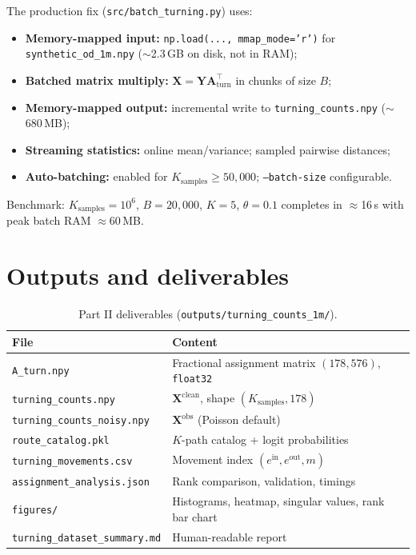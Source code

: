 \documentclass[11pt,a4paper]{report}
\newcommand{\mathbfX}{\mathbf{X}}
\newcommand{\mathbfY}{\mathbf{Y}}
\newcommand{\Aturn}{\mathbf{A}_{\mathrm{turn}}}
\begin{document}
The production fix (\texttt{src/batch\_turning.py}) uses:
\begin{itemize}[noitemsep]
    \item \textbf{Memory-mapped input:} \texttt{np.load(..., mmap\_mode='r')} for \texttt{synthetic\_od\_1m.npy} ($\sim$2.3\,GB on disk, not in RAM);
    \item \textbf{Batched matrix multiply:} $\mathbfX=\mathbfY\Aturn^\top$ in chunks of size $B$;
    \item \textbf{Memory-mapped output:} incremental write to \texttt{turning\_counts.npy} ($\sim$680\,MB);
    \item \textbf{Streaming statistics:} online mean/variance; sampled pairwise distances;
    \item \textbf{Auto-batching:} enabled for $K_{\mathrm{samples}}\ge 50{,}000$; \texttt{--batch-size} configurable.
\end{itemize}
Benchmark: $K_{\mathrm{samples}}=10^6$, $B=20{,}000$, $K=5$, $\theta=0.1$ completes in $\approx$16\,s with peak batch RAM $\approx 60$\,MB.

\section{Outputs and deliverables}

\begin{table}[ht]
\centering
\caption{Part II deliverables (\texttt{outputs/turning\_counts\_1m/}).}
\label{tab:outputs2}
\begin{tabular}{@{}ll@{}}
\toprule
\textbf{File} & \textbf{Content} \\
\midrule
\texttt{A\_turn.npy} & Fractional assignment matrix $(178,576)$, \texttt{float32} \\
\texttt{turning\_counts.npy} & $\mathbfX^{\mathrm{clean}}$, shape $(K_{\mathrm{samples}},178)$ \\
\texttt{turning\_counts\_noisy.npy} & $\mathbfX^{\mathrm{obs}}$ (Poisson default) \\
\texttt{route\_catalog.pkl} & $K$-path catalog + logit probabilities \\
\texttt{turning\_movements.csv} & Movement index $(e^{\mathrm{in}},e^{\mathrm{out}},m)$ \\
\texttt{assignment\_analysis.json} & Rank comparison, validation, timings \\
\texttt{figures/} & Histograms, heatmap, singular values, rank bar chart \\
\texttt{turning\_dataset\_summary.md} & Human-readable report \\
\bottomrule
\end{tabular}
\end{table}
\end{document}
